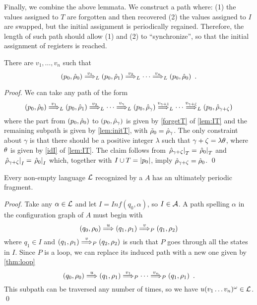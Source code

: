 Finally, we combine the above lemmata. We construct a path where: (1) the values assigned to $T$ are forgotten and then recovered (2) the values assigned to $I$ are swapped, but the initial assignment is periodically regained. Therefore, the length of such path should allow (1) and (2) to ``synchronize'', so that the initial assignment of registers is reached.

\begin{theorem}
\label{thm:loop}


There are $v_1,\dots,v_n$ such that
\[
	(p_0, \hat{\rho}_0) \overset{v_1}{\Longrightarrow}_{L} (p_0, \hat{\rho}_1) \overset{v_2}{\Longrightarrow}_{L} \cdots \overset{v_n}{\Longrightarrow}_{L} (p_0,\hat{\rho}_0) \enspace .
\]
\end{theorem}

\begin{proof}
We can take any path of the form
\[
	(p_0,\hat{\rho}_0) \overset{v_1}{\Longrightarrow}_{L} (p_0,\hat{\rho}_1) \overset{v_2}{\Longrightarrow}_{L} \cdots \overset{v_{\gamma}}{\Longrightarrow}_{L} (p_0,\hat{\rho}_\gamma) \overset{v_{\gamma+1}}{\Longrightarrow}_{L} \cdots \overset{v_{\gamma + \zeta}}{\Longrightarrow}_{L} (p_0,\hat{\rho}_{\gamma + 
	 \zeta})
\]
where the part from $(p_0,\hat{\rho}_0)$ to $(p_0,\hat{\rho}_\gamma)$ is given by \eqref{forgetT} of \cref{lem:IT} and the remaining subpath is given by \cref{lem:initT}, with $\tilde{\rho}_0 = \hat{\rho}_\gamma$. The only constraint about $\gamma$ is that there should be a positive integer $\lambda$ such that $\gamma + \zeta = \lambda \theta$, where $\theta$ is given by \eqref{idI} of \cref{lem:IT}. The claim follows from $\left.\hat{\rho}_{\gamma + \zeta}\right|_{T} = \left.\hat{\rho}_0\right|_{T}$ and 
$\left.\hat{\rho}_{\gamma + \zeta}\right|_{I} = \left.\hat{\rho}_0\right|_{I}$ which, together with $I \cup T = |p_0|$, imply $\hat{\rho}_{\gamma + \zeta} = \hat{\rho}_0$.
\qed
\end{proof}


\begin{theorem}
Every non-empty language $\mathcal{L}$ recognized by a \hdma{} $A$ has an ultimately periodic fragment.
\end{theorem}
\begin{proof}
Take any $\alpha \in \mathcal{L}$ and let $I = Inf(q_0,\alpha)$, so $I \in \mathcal{A}$. A path spelling $\alpha$ in the configuration graph of $A$ must  begin with
\[
	(q_0,\rho_0) \overset{u}{\Longrightarrow} (q_1,\rho_1) \overset{v}{\Longrightarrow}_{P} (q_1,\rho_2)
\]
where $q_1 \in I$ and $(q_1,\rho_1) \overset{v}{\Longrightarrow}_{P} (q_2,\rho_2)$ is such that $P$ goes through all the states in $I$. Since $P$ is a loop, we can replace its induced path with a new one given by \cref{thm:loop} 
\[
	(q_0,\rho_0) \overset{u}{\Longrightarrow} (q_1,\rho_1) \overset{v_1}{\Longrightarrow}_{P} \cdots \overset{v_n}{\Longrightarrow}_{P} (q_1,\rho_1) \enspace .
\]
This subpath can be traversed any number of times, so we have $u(v_1\dots v_n)^\omega \in \mathcal{L}$.
\qed
\end{proof}
